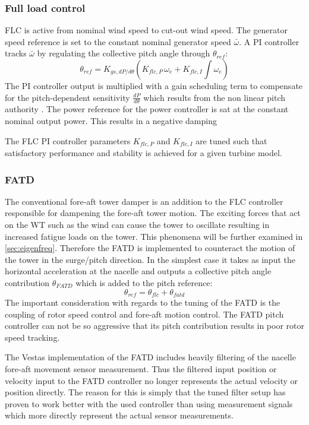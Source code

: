 \subsubsection{Full load control}
FLC is active from nominal wind speed to cut-out wind speed. The generator speed reference is set to the constant nominal generator speed $ \bar{\omega} $. A PI controller tracks $ \bar{\omega} $ by regulating the collective pitch angle through $ \theta_{ref} $:
\begin{equation}\label{eq:pi_flc_ctrl}
	\theta_{ref} = K_{gs,dP/d\theta} \left(K_{flc,P} \, \omega_e + K_{flc,I} \int \omega_e\right)
\end{equation}
The PI controller output is multiplied with a gain scheduling term to compensate for the pitch-dependent sensitivity $ \frac{dP}{d\theta} $ which results from the non linear pitch authority \cite{Pao2009}. The power reference for the power controller is sat at the constant nominal output power. This results in a negative damping 

The FLC PI controller parameters $ K_{flc,P} $ and $ K_{flc,I} $ are tuned such that satisfactory performance and stability is achieved for a given turbine model. 


\subsubsection{FATD}
The conventional fore-aft tower damper is an addition to the FLC controller responsible for dampening the fore-aft tower motion. The exciting forces that act on the WT such as the wind can cause the tower to oscillate resulting in increased fatigue loads on the tower. This phenomena will be further examined in \cref{sec:eigenfreq}. Therefore the FATD is implemented to counteract the motion of the tower in the surge/pitch direction. In the simplest case it takes as input the horizontal acceleration at the nacelle and outputs a collective pitch angle contribution $ \theta_{FATD} $ which is added to the pitch reference:
\begin{equation}\label{eq:fatd}
	\theta_{ref} = \theta_{flc} + \theta_{fatd}
\end{equation}
The important consideration with regards to the tuning of the FATD is the coupling of rotor speed control and fore-aft motion control. The FATD pitch controller can not be so aggressive that its pitch contribution results in poor rotor speed tracking.

The Vestas implementation of the FATD includes heavily filtering of the nacelle fore-aft movement sensor measurement. Thus the filtered input position or velocity input to the FATD controller no longer represents the actual velocity or position directly. The reason for this is simply that the tuned filter setup has proven to work better with the used controller than using measurement signals which more directly represent the actual sensor measurements.


